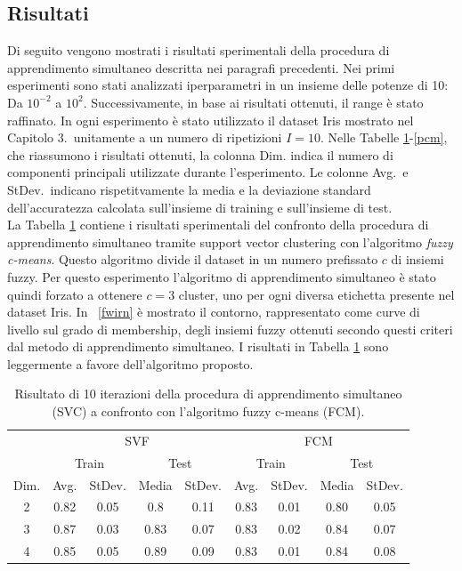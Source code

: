 \documentclass [11pt,a4paper,twoside,openright] {book}
\begin{document}
\subsection{Risultati}
Di seguito vengono mostrati i risultati sperimentali della procedura di apprendimento simultaneo descritta nei paragrafi precedenti. Nei primi esperimenti sono stati analizzati iperparametri in un insieme delle potenze di 10: Da $10^{-2}$ a $10^2$. Successivamente, in base ai risultati ottenuti, il range è stato raffinato. In ogni esperimento è stato utilizzato il dataset Iris mostrato nel Capitolo 3.\ unitamente a un numero di ripetizioni $I=10$. Nelle Tabelle \ref{wirn}-\ref{pcm}, che riassumono i risultati ottenuti, la colonna Dim. indica il numero di componenti principali utilizzate durante l'esperimento. Le colonne Avg.\ e StDev.\ indicano rispetitvamente la media e la deviazione standard dell'accuratezza calcolata sull'insieme di training e sull'insieme di test.\\
La Tabella \ref{wirn} contiene i risultati sperimentali del confronto della procedura di apprendimento simultaneo tramite support vector clustering con l'algoritmo \textit{fuzzy c-means}\cite{bezdek1984fcm}. Questo algoritmo divide il dataset in un numero prefissato $c$ di insiemi fuzzy. Per questo esperimento l'algoritmo di apprendimento simultaneo è stato quindi forzato a ottenere $c=3$ cluster, uno per ogni diversa etichetta presente nel dataset Iris. In \figurename~\ref{fwirn} è mostrato il contorno, rappresentato come curve di livello sul grado di membership, degli insiemi fuzzy ottenuti secondo questi criteri dal metodo di apprendimento simultaneo. I risultati in Tabella \ref{wirn} sono leggermente a favore dell'algoritmo proposto.
\begin{table}[!tb]
\caption{Risultato di 10 iterazioni della procedura di apprendimento simultaneo (SVC) a confronto con l'algoritmo fuzzy c-means (FCM)\label{wirn}.}
\begin{tabular}{|c|c|c|c|c|c|c|c|c|}
\hline
& \multicolumn{4}{|c|}{SVF} & \multicolumn{4}{|c|}{FCM}\\
\cline{2-9}
& \multicolumn{2}{|c|}{Train} & \multicolumn{2}{|c|}{Test} & \multicolumn{2}{|c|}{Train} & \multicolumn{2}{|c|}{Test}\\
\hline
Dim. & Avg. & StDev. & Media & StDev. & Avg. & StDev. & Media & StDev. \\
\hline
2 & 0.82 & 0.05 & 0.8 & 0.11 & 0.83 & 0.01 & 0.80 & 0.05 \\
3 & 0.87 & 0.03 & 0.83 & 0.07 & 0.83 & 0.02 & 0.84 & 0.07 \\
4 & 0.85 & 0.05 & 0.89 & 0.09 & 0.83 & 0.01 & 0.84 & 0.08 \\
\hline
\end{tabular}
\end{table}
\end{document}
